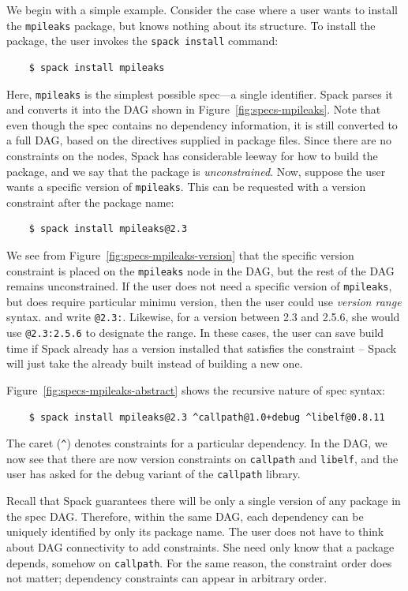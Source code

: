 We begin with a simple example.
Consider the case where a user wants to install the {\tt mpileaks} package, but knows
nothing about its structure.  To install the package, the user invokes the {\tt spack install}
command:
%
\begin{verbatim}
    $ spack install mpileaks
\end{verbatim}
%
Here, {\tt mpileaks} is the simplest possible spec---a single identifier.
Spack parses it and converts it into the DAG shown in Figure~\ref{fig:specs-mpileaks}.
Note that even though the spec contains no dependency information, it is still 
converted to a full DAG, based on the directives supplied in package files. Since there
are no constraints on the nodes, Spack has considerable leeway for how to build the package,
and we say that the package is {\it unconstrained}.
%
Now, suppose the user wants a specific version of {\tt mpileaks}.  This can be requested
with a version constraint after the package name:
%
\begin{verbatim}
    $ spack install mpileaks@2.3
\end{verbatim}
%
We see from Figure~\ref{fig:specs-mpileaks-version} that the specific version constraint is
placed on the {\tt mpileaks} node in the DAG, but the rest of the DAG remains unconstrained.
If the user does not need a specific version of {\tt mpileaks}, but does require
particular minimu version, then the user could use {\it version range} syntax.
and write {\tt @2.3:}.  Likewise, for a version between 2.3 and 2.5.6, she would use
{\tt @2.3:2.5.6} to designate the range. In these cases, the user can save build time if
Spack already has a version installed that satisfies the constraint -- Spack will just take
the already built instead of building a new one.

Figure~\ref{fig:specs-mpileaks-abstract} shows the recursive nature of spec syntax:
%
\begin{verbatim}
    $ spack install mpileaks@2.3 ^callpath@1.0+debug ^libelf@0.8.11
\end{verbatim}
%
The caret (\verb|^|) denotes constraints for a particular dependency.  In the DAG,
we now see that there are now version constraints on {\tt callpath} and {\tt libelf},
and the user has asked for the debug variant of the {\tt callpath} library.

Recall that Spack guarantees there will be only a single version of any package in 
the spec DAG.  Therefore, within the same DAG, each dependency can be uniquely identified by 
only its package name.  The user does not have to think about DAG connectivity to add
constraints.  She need only know that a package depends, somehow on {\tt callpath}. 
For the same reason, the constraint order does not matter; dependency constraints
can appear in arbitrary order.

